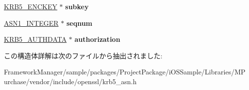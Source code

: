 \begin{DoxyCompactItemize}
\item 
\hypertarget{structkrb5__authenticator__st_a03ed3e43b6e55c3109d5531ee904b8bf}{}\hyperlink{structkrb5__encryptionkey__st}{K\+R\+B5\+\_\+\+E\+N\+C\+K\+E\+Y} $\ast$ {\bfseries subkey}\label{structkrb5__authenticator__st_a03ed3e43b6e55c3109d5531ee904b8bf}

\item 
\hypertarget{structkrb5__authenticator__st_a536a8d151e989aa249609ec5d482ed9c}{}\hyperlink{structasn1__string__st}{A\+S\+N1\+\_\+\+I\+N\+T\+E\+G\+E\+R} $\ast$ {\bfseries seqnum}\label{structkrb5__authenticator__st_a536a8d151e989aa249609ec5d482ed9c}

\item 
\hypertarget{structkrb5__authenticator__st_afbcfe629c218e03f97fecdfa8f594460}{}\hyperlink{structkrb5__authorization__st}{K\+R\+B5\+\_\+\+A\+U\+T\+H\+D\+A\+T\+A} $\ast$ {\bfseries authorization}\label{structkrb5__authenticator__st_afbcfe629c218e03f97fecdfa8f594460}

\end{DoxyCompactItemize}


この構造体詳解は次のファイルから抽出されました\+:\begin{DoxyCompactItemize}
\item 
Framework\+Manager/sample/packages/\+Project\+Package/i\+O\+S\+Sample/\+Libraries/\+M\+Purchase/vendor/include/openssl/krb5\+\_\+asn.\+h\end{DoxyCompactItemize}
